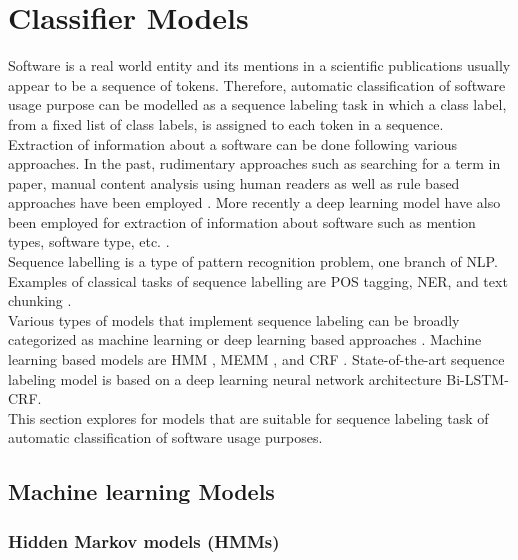 \chapter{Classifier Models}
\label{ch:chapter04}
 
%
%

Software is a real world entity and its mentions in a scientific publications usually appear to be a sequence of tokens.  Therefore, automatic classification of software usage purpose can be modelled as a sequence labeling task in which a class label, from a fixed list of class labels, is assigned to each token in a sequence. \\

Extraction of information about a software can be done following various approaches. In the past, rudimentary approaches such as searching for a term in paper, manual content analysis using human readers as well as rule based approaches have been employed \citep{kruger2019literature}.  More recently a deep learning model have also been employed for extraction of  information about software such as mention types, software type, etc. \citep{schindler2022role}. \\

Sequence labelling is a type of pattern recognition problem, one branch of \ac{NLP}. Examples of classical tasks of sequence labelling are \ac{POS} tagging, \ac{NER}, and text chunking \citep{akhundov2018sequence, he2020survey}.  \\

Various types of models that implement sequence labeling can be broadly categorized as machine learning or deep learning based approaches \citep{he2020survey}. Machine learning based models are \ac{HMM} \citep{kupiec1992robust}, \ac{MEMM} \citep{mccallum2000maximum}, and \ac{CRF} \citep{lafferty2001conditional}.  State-of-the-art sequence labeling model is based on a deep learning neural network architecture \ac{Bi-LSTM-CRF}. \\

This section explores for models that are suitable for sequence labeling task of automatic classification of software usage purposes. 

\section{Machine learning Models}
\label{sec:chapter05:MLModels}

\subsection{Hidden Markov models (\ac{HMM}s)}
\label{sec:chapter05:MLModels:HMMS}

